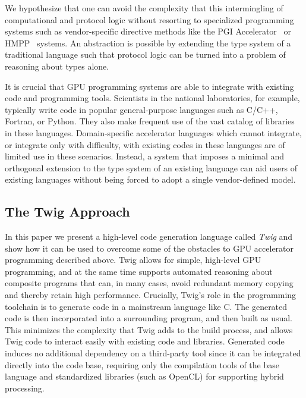 We hypothesize that one can avoid the complexity that this intermingling of
computational and protocol logic without resorting to specialized programming
systems such as vendor-specific directive methods like the PGI
Accelerator~\cite{pgi-accelerate} or HMPP~\cite{hmpp} systems. An abstraction is
possible by extending the type system of a traditional language such that
protocol logic can be turned into a problem of reasoning about types alone.


It is crucial that GPU programming systems are able to integrate with existing
code and programming tools. Scientists in the national laboratories, for
example, typically write code in popular general-purpose languages such as
C/C++, Fortran, or Python. They also make frequent use of the vast catalog of
libraries in these languages. Domain-specific accelerator languages which cannot
integrate, or integrate only with difficulty, with existing codes in these
languages are of limited use in these scenarios. Instead, a system that imposes
a minimal and orthogonal extension to the type system of an existing language
can aid users of existing languages without being forced to adopt a single
vendor-defined model.

\subsection{The Twig Approach}

In this paper we present a high-level code generation language called
\emph{Twig} and show how it can be used to overcome some of the obstacles to GPU
accelerator programming described above. Twig allows for simple, high-level GPU
programming, and at the same time supports automated reasoning about composite
programs that can, in many cases, avoid redundant memory copying and thereby
retain high performance. Crucially, Twig's role in the programming toolchain is
to generate code in a mainstream language like C. The generated code is then
incorporated into a surrounding program, and then built as usual. This minimizes
the complexity that Twig adds to the build process, and allows Twig code to
interact easily with existing code and libraries. Generated code induces no
additional dependency on a third-party tool since it can be integrated directly
into the code base, requiring only the compilation tools of the base language
and standardized libraries (such as OpenCL) for supporting hybrid processing.

